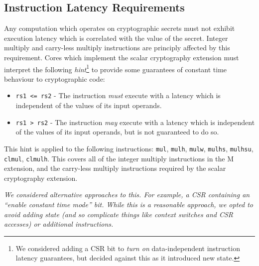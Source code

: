 
\subsection{Instruction Latency Requirements}
\label{sec:scalar:timing}

Any computation which operates on cryptographic secrets must not
exhibit execution latency which is correlated with the value of the
secret.
Integer multiply and carry-less multiply instructions are principly affected
by this requirement.
Cores which implement the scalar cryptography
extension must interpret the following {\em hint}\footnote{
We considered adding a CSR bit to {\em turn on} data-independent instruction
latency guarantees, but decided against this as it introduced new state.
} to provide some
guarantees of constant time behaviour to cryptographic code:

\begin{itemize}
\item {\tt rs1 <= rs2} - 
    The instruction {\em must} execute with a latency which is
    independent of the values of its input operands.
\item {\tt rs1  > rs2} - 
    The instruction {\em may} execute with a latency which is
    independent of the values of its input operands, but is not
    guaranteed to do so.
\end{itemize}

This hint is applied to the following instructions:
{\tt mul},
{\tt mulh},
{\tt mulw},
{\tt mulhs},
{\tt mulhsu},
{\tt clmul},
{\tt clmulh}.
This covers all of the integer multiply instructions in the
M extension, and the carry-less multiply instructions required by the
scalar cryptography extension.

\begin{displayquote}{\em
We considered alternative approaches to this.
For example, a CSR containing an ``enable constant time mode'' bit.
While this is a reasonable approach, we opted to avoid adding
state (and so complicate things like context switches and CSR accesses)
or additional instructions.
}\end{displayquote}

